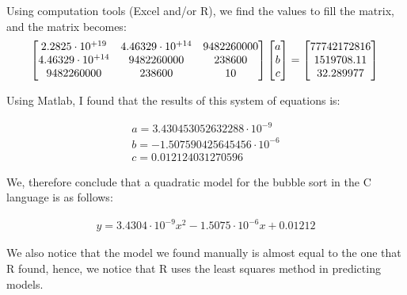 \documentclass[]{report}
\begin{document}
				Using computation tools (Excel and/or R), we find the values to fill the matrix, and the matrix becomes:
				\\
				\begin{equation}
						\begin{bmatrix}
						2.2825 \cdot 10^{+19} & 4.46329\cdot 10^{+14} & 9482260000 \\
						4.46329\cdot 10^{+14} & 9482260000 & 238600 \\
						9482260000 & 238600 & 10 \\
						\end{bmatrix}
						\begin{bmatrix}
						a \\
						b \\
						c \\
						\end{bmatrix}
						=
						\begin{bmatrix}
						77742172816 \\
						1519708.11 \\
						32.289977 \\
						\end{bmatrix} \\
				\end{equation}				
		 		
		 		Using Matlab, I found that the results of this system of equations is:
		 		
		 		\begin{equation}
		 			\begin{align}
						a = 3.430453052632288\cdot10^{-9}\\
						b = -1.507590425645456\cdot10^{-6}\\
						c = 0.012124031270596
		 			\end{align}
				\end{equation}
				
				We, therefore conclude that a quadratic model for the bubble sort in the C language is as follows:
				
				\begin{ceqn}
					\begin{align}
		 				y = 3.4304\cdot10^{-9}x^2 -1.5075\cdot10^{-6}x + 0.01212
					\end{align}
				\end{ceqn}
				
				We also notice that the model we found manually is almost equal to the one that R found, hence, we notice that R uses the least squares method in predicting models.
				
\end{document}
